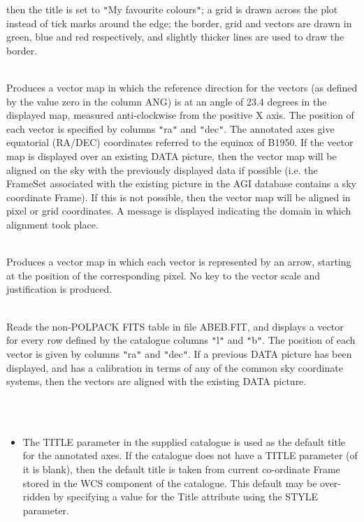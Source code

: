 \documentclass[twoside,11pt]{article}
\renewcommand{\_}{\texttt{\symbol{95}}}
\newlength{\sstexampleslength}
\newcommand{\sstexamplesubsection}[2]{\sloppy
\item[\parbox{\sstexampleslength}{\ssttt #1}] \mbox{} \vspace{1.0ex}
\\ #2 }
\newcommand{\sstnotes}[1]{\item[Notes:] \mbox{} \\[1.3ex] #1}
\newcommand{\sstitemlist}[1]{
  \mbox{} \\
  \vspace{-3.5ex}
  \begin{itemize}
     #1
  \end{itemize}
}
\newcommand{\sstitem}{\item}
\newcommand{\sstexamplesubsection}[2]{\item[{\ssttt #1}] #2}
\newcommand{\sstnotes}[1]{\item[Notes:] #1 }
\newcommand{\sstitemlist}[1]{
      \begin{itemize}
         #1
      \end{itemize}
      \\
   }
\newcommand{\sstitem}{\item}
\begin{document}
{{{         then the title is set to {\tt "}My favourite colours{\tt "}; a grid is drawn
         across the plot instead of tick marks around the edge; the border,
         grid and vectors are drawn in green, blue and red respectively,
         and slightly thicker lines are used to draw the border.
      }
      \sstexamplesubsection{
         polplot poltab ra dec noclear angrot=23.4 frame=eq(B1950)
      }{
         Produces a vector map in which the reference direction for the
         vectors (as defined by the value zero in the column ANG) is at
         an angle of 23.4 degrees in the displayed map, measured
         anti-clockwise from the positive X axis. The position of each vector
         is specified by columns {\tt "}ra{\tt "} and {\tt "}dec{\tt "}. The annotated axes give
         equatorial (RA/DEC) coordinates referred to the equinox of B1950.
         If the vector map is displayed over an existing DATA picture, then
         the vector map will be aligned on the sky with the previously
         displayed data if possible (i.e. the FrameSet associated with the
         existing picture in the AGI database contains a sky coordinate
         Frame). If this is not possible, then the vector map will be
         aligned in pixel or grid coordinates. A message is displayed
         indicating the domain in which alignment took place.
      }
      \sstexamplesubsection{
         polplot poltab arrow=0.01 just=start nokey
      }{
         Produces a vector map in which each vector is represented by an
         arrow, starting at the position of the corresponding pixel.  No key
         to the vector scale and justification is produced.
      }
      \sstexamplesubsection{
         polplot ABEB.FIT clear=no colx=ra coly=dec colmag=l colang=b
      }{
         Reads the non-POLPACK FITS table in file ABEB.FIT, and displays a
         vector for every row defined by the catalogue columns {\tt "}l{\tt "} and {\tt "}b{\tt "}.
         The position of each vector is given by columns {\tt "}ra{\tt "} and {\tt "}dec{\tt "}.
         If a previous DATA picture has been displayed, and has a calibration
         in terms of any of the common sky coordinate systems, then the
         vectors are aligned with the existing DATA picture.
      }
   }
   \sstnotes{
      \sstitemlist{

         \sstitem
         The TITLE parameter in the supplied catalogue is used as the default
         title for the annotated axes. If the catalogue does not have a TITLE
         parameter (of it is blank), then the default title is taken from current
         co-ordinate Frame stored in the WCS component of the catalogue. This
         default may be over-ridden by specifying a value for the Title
         attribute using the STYLE parameter.

}}}
\end{document}
